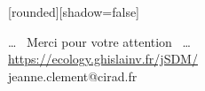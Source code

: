 
{
  [rounded][shadow=false]
  \begin{frame}[plain]
    \begin{block}{}
      \begin{center}
        \ldots~ Merci pour votre attention ~\ldots\\
        \url{https://ecology.ghislainv.fr/jSDM/}\\
        jeanne.clement@cirad.fr
      \end{center}
    \end{block}
  \end{frame}
}